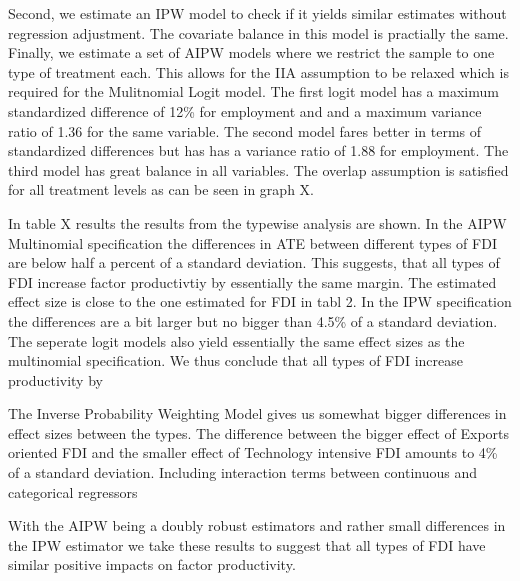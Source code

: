 \documentclass[a4paper,11pt]{scrartcl}
\begin{document}
Second, we estimate an IPW model to check if it yields similar estimates without regression adjustment. The covariate balance in this model is practially the same. Finally, we estimate a set of AIPW models where we restrict the sample to one type of treatment each. This allows for the IIA assumption to be relaxed which is required for the Mulitnomial Logit model. The first logit model has a maximum standardized difference of 12\% for employment and and a maximum variance ratio of 1.36 for the same variable. The second model fares better in terms of standardized differences but has has a variance ratio of 1.88 for employment. The third model has great balance in all variables. The overlap assumption is satisfied for all treatment levels as can be seen in graph X. 


In table X results the results from the typewise analysis are shown. In the AIPW Multinomial specification the differences in ATE between different types of FDI are below half a percent of a standard deviation. This suggests, that all types of FDI increase factor productivtiy by essentially the same margin. The estimated effect size is close to the one estimated for FDI in tabl 2. In the IPW specification the differences are a bit larger but no bigger than 4.5\% of a standard deviation. The seperate logit models also yield essentially the same effect sizes as the multinomial specification. We thus conclude that all types of FDI increase productivity by 

The Inverse Probability Weighting Model gives us somewhat bigger differences in effect sizes between the types. The difference between the bigger effect of Exports oriented FDI and the smaller effect of Technology intensive FDI amounts to 4\% of a standard deviation. Including interaction terms between continuous and categorical regressors 

With the AIPW being a doubly robust estimators and rather small differences in the IPW estimator we take these results to suggest that all types of FDI have similar positive impacts on factor productivity. 
\end{document}
